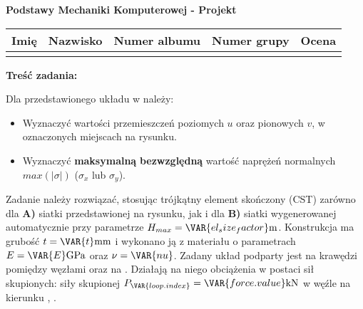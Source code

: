 \documentclass[a4paper,10pt]{article}
\begin{document}
\begin{center}
    {\Large \textbf{Podstawy Mechaniki Komputerowej - Projekt}}
    \end{center}

    \begin{table}[ht]
        \centering
        \begin{tabular}{
            m{}m{}m{}m{}m{}}
        \toprule
        Imię & Nazwisko & Numer albumu & Numer grupy  & Ocena \\ \midrule
             &          &              &              &       \\ \bottomrule
        \end{tabular}
        \label{tab:dane_studenta}
    \end{table}

    \noindent\textbf{Treść zadania:} \vspace{1mm}

    Dla przedstawionego układu w \textbf{} należy:
    \begin{itemize}
        \item Wyznaczyć wartości przemieszczeń poziomych $u$ oraz pionowych $v$, w oznaczonych miejscach na rysunku.
        \item Wyznaczyć \textbf{maksymalną} \textbf{bezwzględną} wartość naprężeń normalnych $max(|\sigma|)$ ($\sigma_x$ lub $\sigma_y$).
    \end{itemize}

    Zadanie należy rozwiązać, stosując trójkątny element skończony (CST) zarówno dla \textbf{A)} siatki przedstawionej na rysunku, jak i dla \textbf{B)} siatki wygenerowanej automatycznie przy parametrze $H_{max} = \VAR{el_size_factor} \si{m}$.  Konstrukcja ma grubość $t = \VAR{t} \si{mm}$ i wykonano ją z materiału o parametrach $E = \VAR{E} \si{GPa}$ oraz $\nu = \VAR{nu}$. Zadany układ podparty jest na krawędzi pomiędzy węzłami
         oraz  na %
    . 
    Działają na niego obciążenia w postaci 
             sił skupionych: 
             siły skupionej
        $P_\VAR{loop.index} = \VAR{force.value} \si{\kilo\newton}$ w węźle  na kierunku %
        , 
    .
\end{document}
